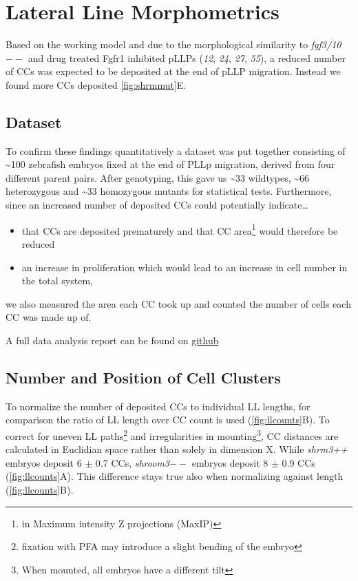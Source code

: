 \documentclass[11pt,singlespacinge,twoside]{reedthesis} %
\providecommand{\tightlist}{%
  \setlength{\itemsep}{0pt}\setlength{\parskip}{0pt}}
\begin{document}
\hypertarget{lateral-line-morphometrics}{%
\section{Lateral Line Morphometrics}\label{lateral-line-morphometrics}}

Based on the working model and due to the morphological similarity to \emph{fgf3/10}\(--\) and drug treated Fgfr1 inhibited pLLPs (\emph{12}, \emph{24}, \emph{27}, \emph{55}), a reduced number of CCs was expected to be deposited at the end of pLLP migration. Instead we found more CCs deposited \ref{fig:shrmmut}E.

\hypertarget{dataset}{%
\subsection{Dataset}\label{dataset}}

To confirm these findings quantitatively a dataset was put together consisting of \textasciitilde{}100 zebrafish embryos fixed at the end of PLLp migration, derived from four different parent pairs. After genotyping, this gave us \textasciitilde{}33 wildtypes, \textasciitilde{}66 heterozygous and \textasciitilde{}33 homozygous mutants for statistical tests. Furthermore, since an increased number of deposited CCs could potentially indicate\ldots{}
\begin{itemize}
\tightlist
\item
  that CCs are deposited prematurely and that CC area\footnote{in Maximum intensity Z projections (MaxIP)} would therefore be reduced
\item
  an increase in proliferation which would lead to an increase in cell number in the total system,
\end{itemize}
we also measured the area each CC took up and counted the number of cells each CC was made up of.

A full data analysis report can be found on \href{https://github.com/KleinhansDa/reports/blob/master/b7a875fc1ea228b9061041b7cec4bd3c52ab3ce3/clusters_eom.html}{github}

\hypertarget{res-ccounts}{%
\subsection{Number and Position of Cell Clusters}\label{res-ccounts}}

To normalize the number of deposited CCs to individual LL lengths, for comparison the ratio of LL length over CC count is used (\ref{fig:llcounts}B). To correct for uneven LL paths\footnote{fixation with PFA may introduce a slight bending of the embryo} and irregularities in mounting\footnote{When mounted, all embryos have a different tilt}, CC distances are calculated in Euclidian space rather than solely in dimension X. While \emph{shrm3++} embryos deposit 6 \(\pm\) 0.7 CCs, \emph{shroom3}\(--\) embryos deposit 8 \(\pm\) 0.9 CCs (\ref{fig:llcounts}A). This difference stays true also when normalizing against length (\ref{fig:llcounts}B).
\end{document}
